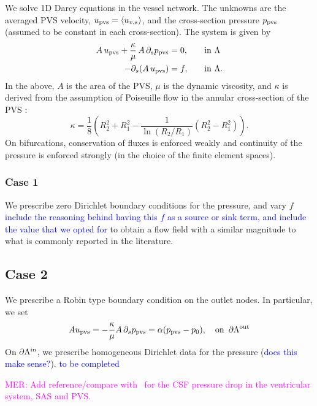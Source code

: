 \documentclass[fleqn,10pt]{wlscirep}
\newcommand{\rami}[1]{\textcolor{blue}{#1}}
\newcommand{\mer}[1]{\textcolor{magenta}{#1}}
\begin{document}
We solve 1D Darcy equations in the vessel network. The unknowns are the averaged PVS velocity, $u_{\rm pvs} = \langle u_{v,s} \rangle$, and the cross-section pressure $p_{\rm pvs} $ (assumed to be constant in each cross-section). The system is given by  \cite{daversin2022geometrically, gjerde2024directional} 
\begin{alignat}{2}
A \,  u_{\rm pvs}   + \frac{\kappa}{\mu} \, A \, \partial_{s} p_{\rm pvs} & = 0, &&  \quad \rm in  \,\, \Lambda  \\ 
-\partial_s (A \, u_{\rm pvs}) & = f, && \quad \rm in  \,\, \Lambda .  
\end{alignat} 
In the above, $A$ is the area of the PVS, $\mu$ is the dynamic viscosity, and $\kappa$ is derived from the assumption of Poiseuille
flow in the annular cross-section of the PVS \cite{daversin2022geometrically,tithof2022network}: 
\begin{equation}
\kappa = \frac18 \left( R_2^2 + R_1^2 - \frac{1}{\ln(R_2/R_1)} (R_2^2- R_1^2) \right). 
\end{equation}
On bifurcations, conservation of fluxes is enforced weakly and continuity of the pressure is enforced strongly (in the choice of the finite element spaces). 

\subsubsection*{Case 1} We prescribe zero Dirichlet boundary conditions for the pressure, and vary $f$ \rami{include the reasoning behind having this $f$ as a source or sink term, and include the value that we opted for} to obtain a flow field with a similar magnitude to what is commonly reported in the literature.  

\subsection*{Case 2} We prescribe a Robin type boundary condition on the outlet nodes. In particular, we set 
\begin{equation}
A  u_{\rm pvs} =  - \frac{\kappa}{ \mu} A\, \partial_s p_{\rm pvs} = \alpha (p_{\rm pvs} - p_0), \quad  \rm on \,\,\, \partial \Lambda^{\rm out} 
\end{equation}
On $\partial \Lambda^{\rm in}$, we prescribe homogeneous Dirichlet data for the pressure (\rami{does this make sense?}). 
\rami{to be completed }

\mer{MER: Add reference/compare with~\cite{vinje2019respiratory} for the CSF pressure drop in the ventricular system, SAS and PVS.}
\end{document}
